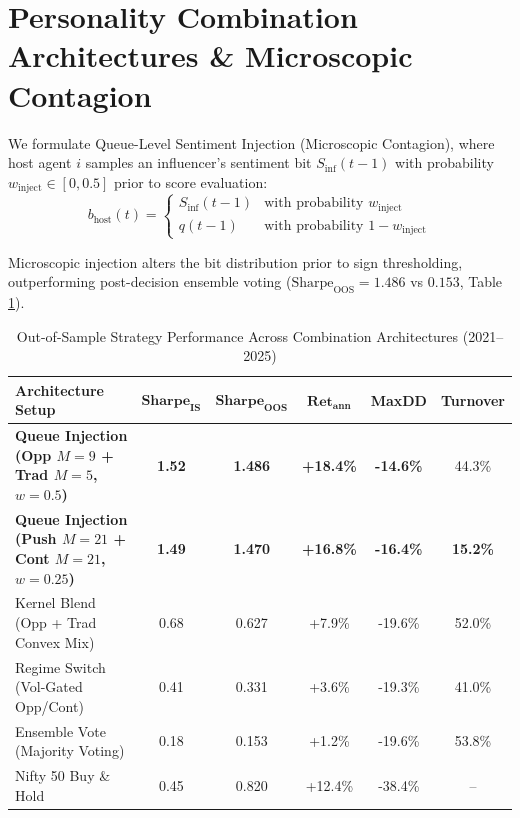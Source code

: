 \documentclass[11pt,a4paper]{article}
\begin{document}
\section{Personality Combination Architectures \& Microscopic Contagion}

We formulate Queue-Level Sentiment Injection (Microscopic Contagion), where host agent $i$ samples an influencer's sentiment bit $S_{\text{inf}}(t-1)$ with probability $w_{\text{inject}} \in [0, 0.5]$ prior to score evaluation:
\begin{equation}
    b_{\text{host}}(t) = 
    \begin{cases} 
        S_{\text{inf}}(t-1) & \text{with probability } w_{\text{inject}} \\ 
        q(t-1) & \text{with probability } 1 - w_{\text{inject}} 
    \end{cases}
\end{equation}

Microscopic injection alters the bit distribution prior to sign thresholding, outperforming post-decision ensemble voting ($\text{Sharpe}_{\text{OOS}} = 1.486$ vs $0.153$, Table \ref{tab:strategy_comparison}).

\begin{table}[htbp]
\centering
\caption{Out-of-Sample Strategy Performance Across Combination Architectures (2021--2025)}
\label{tab:strategy_comparison}
\begin{tabular}{lccccc}
\toprule
\textbf{Architecture Setup} & $\mathbf{\text{Sharpe}_{\text{IS}}}$ & $\mathbf{\text{Sharpe}_{\text{OOS}}}$ & $\mathbf{\text{Ret}_{\text{ann}}}$ & \textbf{MaxDD} & \textbf{Turnover} \\
\midrule
\textbf{Queue Injection (Opp $M=9$ + Trad $M=5$, $w=0.5$)} & \textbf{1.52} & \textbf{1.486} & \textbf{+18.4\%} & \textbf{-14.6\%} & 44.3\% \\
\textbf{Queue Injection (Push $M=21$ + Cont $M=21$, $w=0.25$)} & \textbf{1.49} & \textbf{1.470} & \textbf{+16.8\%} & \textbf{-16.4\%} & \textbf{15.2\%} \\
Kernel Blend (Opp + Trad Convex Mix) & 0.68 & 0.627 & +7.9\% & -19.6\% & 52.0\% \\
Regime Switch (Vol-Gated Opp/Cont) & 0.41 & 0.331 & +3.6\% & -19.3\% & 41.0\% \\
Ensemble Vote (Majority Voting) & 0.18 & 0.153 & +1.2\% & -19.6\% & 53.8\% \\
Nifty 50 Buy \& Hold & 0.45 & 0.820 & +12.4\% & -38.4\% & -- \\
\bottomrule
\end{tabular}
\end{table}
\end{document}
